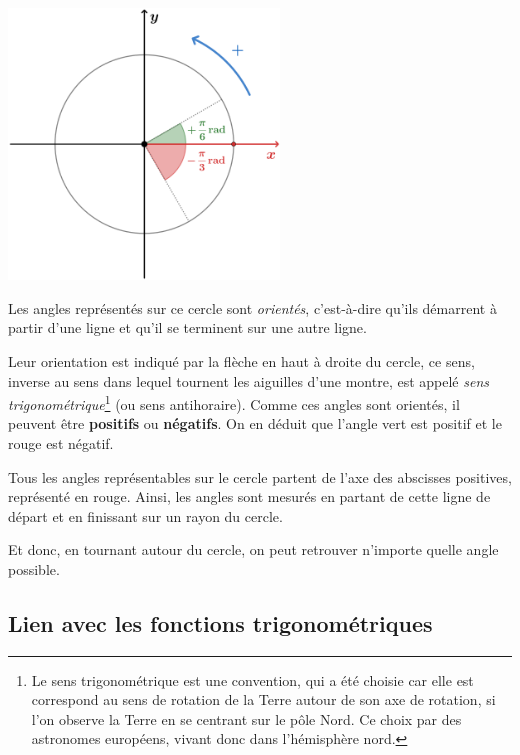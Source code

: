 \documentclass[a4paper]{article}
\begin{document}
			\begin{multicols}{2}

				\begin{center}
					\includegraphics[height=7.2cm]{Image/Cercle Trigo/Cercle_trigo_sens_trigo.PNG}
					\vspace{0.25cm}
				\end{center}

				Les angles représentés sur ce cercle sont \emph{orientés},
				c'est-à-dire qu'ils démarrent à partir d'une ligne et qu'il se terminent sur une autre ligne.
				
				Leur orientation est indiqué par la flèche en haut à droite du cercle, 
				ce sens, inverse au sens dans lequel tournent les aiguilles d'une montre, 
				est appelé \emph{sens trigonométrique}\footnote{
					Le sens trigonométrique est une convention,
					qui a été choisie car elle est correspond au sens de rotation
					de la Terre autour de son axe de rotation,
					si l'on observe la Terre en se centrant sur le pôle Nord.
					Ce choix par des astronomes européens, vivant donc dans l'hémisphère nord.
				} (ou sens antihoraire).
				Comme ces angles sont orientés, il peuvent être \textbf{positifs} ou \textbf{négatifs}.
				On en déduit que l'angle vert est positif et le rouge est négatif. 

				Tous les angles représentables sur le cercle partent de l'axe des abscisses positives,
				représenté en rouge.
				Ainsi, les angles sont mesurés en partant de cette ligne de départ
				et en finissant sur un rayon du cercle.

				Et donc, en tournant autour du cercle, on peut retrouver n'importe quelle angle possible. 

			\end{multicols}

		\subsection{Lien avec les fonctions trigonométriques}
\end{document}
